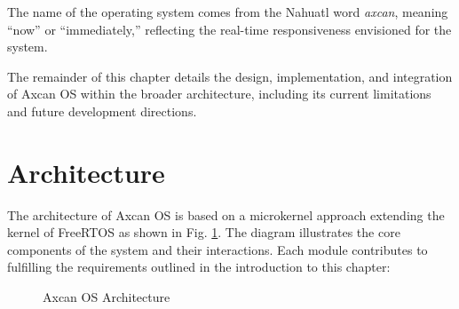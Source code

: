 The name of the operating system comes from the Nahuatl word \textit{axcan}, meaning “now” or “immediately,” reflecting the real-time responsiveness envisioned for the system.

The remainder of this chapter details the design, implementation, and integration of Axcan OS within the broader architecture, including its current limitations and future development directions.

\section{Architecture}
The architecture of Axcan OS is based on a microkernel approach extending the kernel of FreeRTOS as shown in Fig. \ref{fig:os_arch}. The diagram illustrates the core components of the system and their interactions. Each module contributes to fulfilling the requirements outlined in the introduction to this chapter:

\begin{figure}
	\centering
	
	\caption{Axcan OS Architecture}
	\label{fig:os_arch}
\end{figure}

